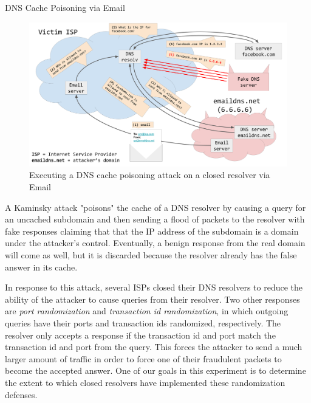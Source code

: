 \documentclass[final]{beamer}
\newlength{\onecolwid}
\begin{document}
\begin{frame}[t]
\begin{columns}[t]
\begin{column}{\onecolwid}
\begin{block}{DNS Cache Poisoning via Email}
\begin{figure}[cache_poisoning]
  \centering
  \includegraphics[width=\onecolwid]{Tim_Presentation}
  \caption{Executing a DNS cache poisoning attack on a closed resolver via Email}
\end{figure}

A Kaminsky attack "poisons" the cache of a DNS resolver by causing a query for an uncached subdomain and then sending a flood of packets to the resolver with fake responses claiming that that the IP address of the subdomain is a domain under the attacker's control.  Eventually, a benign response from the real domain will come as well, but it is discarded because the resolver already has the false answer in its cache.

In response to this attack, several ISPs closed their DNS resolvers to reduce the ability of the attacker to cause queries from their resolver.  Two other responses are \emph{port randomization} and \emph{transaction id randomization}, in which outgoing queries have their ports and transaction ids randomized, respectively.  The resolver only accepts a response if the transaction id and port match the transaction id and port from the query.  This forces the attacker to send a much larger amount of traffic in order to force one of their fraudulent packets to become the accepted answer. %
One of our goals in this experiment is to determine the extent to which closed resolvers have implemented these randomization defenses.

\end{block}





\end{column}
\end{columns}
\end{frame}
\end{document}

